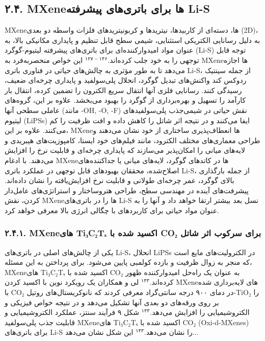 \documentclass[12pt,a4paper,twocolumn]{article} %
\newcommand{\persian}[1]{\textfarsi{#1}}
\newcommand{\english}[1]{\textenglish{#1}}
\begin{document}
\subsection*{\persian{۲.۴. \english{MXene}ها برای باتری‌های پیشرفته \english{Li-S}}}
\persian{
\english{MXene}ها، دسته‌ای از کاربیدها، نیتریدها و کربونیتریدهای فلزات واسطه دو بعدی (\english{2D})، به دلیل رسانایی الکتریکی استثنایی، شیمی سطح قابل تنظیم و پایداری مکانیکی بالا، به عنوان مواد امیدوارکننده‌ای برای باتری‌های پیشرفته لیتیوم-گوگرد (\english{Li-S}) توجه قابل توجهی را به خود جلب کرده‌اند.$^{۱۲۷-۱۴۶}$ این خواص منحصربه‌فرد به \english{MXene}ها اجازه می‌دهد تا به طور مؤثری به چالش‌های حیاتی در فناوری باتری \english{Li-S}، از جمله سینتیک ردوکس کند واکنش‌های تبدیل گوگرد، انحلال پلی‌سولفید و پایداری چرخه‌ای ضعیف، رسیدگی کنند. رسانایی فلزی آنها انتقال سریع الکترون را تضمین کرده، انتقال بار کارآمد را تسهیل و بهره‌برداری از گوگرد را بهبود می‌بخشد. علاوه بر این، گروه‌های عاملی سطحی آنها (مانند \english{-OH, -O, -F}) نقش حیاتی در شیمی‌جذب پلی‌سولفیدهای لیتیوم (\english{LiPSs}) ایفا می‌کنند و در نتیجه اثر شاتل را کاهش داده و افت ظرفیت را کم می‌کنند. علاوه بر این، \english{MXene}ها انعطاف‌پذیری ساختاری از خود نشان می‌دهند و طراحی معماری‌های مختلف الکترود، مانند فیلم‌های خود ایستا، کامپوزیت‌های هیبریدی و لایه‌های میانی را امکان‌پذیر می‌سازند که پایداری چرخه‌ای و قابلیت نرخ را افزایش می‌دهند. با ادغام \english{MXene}ها در کاتدهای گوگرد، لایه‌های میانی یا جداکننده‌های اصلاح‌شده، محققان بهبودهای قابل توجهی در عملکرد باتری \english{Li-S}، از جمله بارگذاری بالای گوگرد، عمر چرخه‌ای طولانی و قابلیت نرخ افزایش‌یافته را نشان داده‌اند. پیشرفت‌های آینده در مهندسی سطح، طراحی هتروساختار و استراتژی‌های عامل‌دار کردن، نقش \english{MXene}ها را در باتری‌های \english{Li-S} نسل بعد بیشتر ارتقا خواهد داد و آنها را به عنوان مواد حیاتی برای کاربردهای با چگالی انرژی بالا معرفی خواهد کرد.
}
\subsubsection*{\persian{۲.۴.۱. \english{MXene}های \english{Ti₃C₂Tₓ} اکسید شده با \english{CO₂} برای سرکوب اثر شاتل}}
\persian{
یکی از چالش‌های اصلی در باتری‌های \english{Li-S}، انحلال \english{LiPSs} در الکترولیت‌های مایع است که منجر به زوال ظرفیت و بازده کولمبی پایین می‌شود. برای پرداختن به این مسئله، \english{MXene}های \english{Ti₃C₂Tₓ} اکسید شده با \english{CO₂} به عنوان یک راه‌حل امیدوارکننده ظهور کرده‌اند.$^{۱۴۳}$ لی و همکاران یک رویکرد نوین با اکسید کردن \english{MXene}های لایه‌برداری شده با \english{CO₂} در دمای ۹۰۰ درجه سانتی‌گراد معرفی کردند که نانوکریستال‌های روتیل-\english{TiO₂} را بر روی ورقه‌های دو بعدی آنها تشکیل می‌دهد و در نتیجه خواص فیزیکی و الکتروشیمیایی را افزایش می‌دهد.$^{۱۴۳}$ شکل ۹ فرآیند سنتز، عملکرد الکتروشیمیایی و قابلیت جذب پلی‌سولفید \english{MXene}های \english{Ti₃C₂Tₓ} اکسید شده با \english{CO₂} (\english{Oxi-d-MXenes}) برای باتری‌های \english{Li-S} را نشان می‌دهد.$^{۱۴۳}$ این شکل نشان می‌دهد...
}
\end{document}
